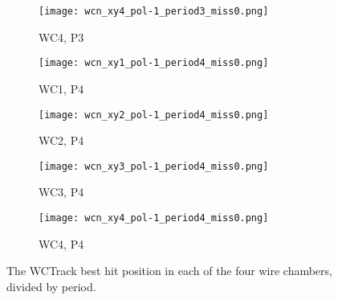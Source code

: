 \begin{figure}[h]
\begin{subfigure}[b]{0.23\textwidth}
            \centering
            \texttt{[image: wcn\_xy4\_pol-1\_period3\_miss0.png]}
            \caption{WC4, P3}
            \label{fig_wc4_p3}
            \end{subfigure}
            \hfill
            \begin{subfigure}[b]{0.23\textwidth}
            \centering
            \texttt{[image: wcn\_xy1\_pol-1\_period4\_miss0.png]}
            \caption{WC1, P4}
            \label{fig_wc1_p4}
            \end{subfigure}
            \hfill             
             \begin{subfigure}[b]{0.23\textwidth}
            \centering
            \texttt{[image: wcn\_xy2\_pol-1\_period4\_miss0.png]}
            \caption{WC2, P4}
            \label{fig_wc2_p4}
            \end{subfigure}
            \hfill 
              \begin{subfigure}[b]{0.23\textwidth}
            \centering
            \texttt{[image: wcn\_xy3\_pol-1\_period4\_miss0.png]}
            \caption{WC3, P4}
            \label{fig_wc3_p4}
            \end{subfigure}
            \hfill    
             \begin{subfigure}[b]{0.23\textwidth}
            \centering
            \texttt{[image: wcn\_xy4\_pol-1\_period4\_miss0.png]}
            \caption{WC4, P4}
            \label{fig_wc4_p4}
            \end{subfigure}
            \hfill
   \caption[short]{The WCTrack best hit position in each of the four wire chambers, divided by period.}
   \label{fig_xyhitsperiod}
  \end{figure}
  
  
  
